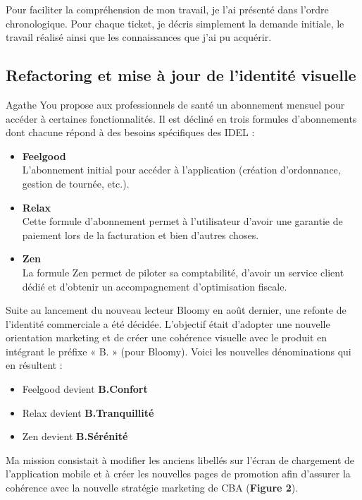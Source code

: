 \documentclass{article}
\begin{document}
Pour faciliter la compréhension de mon travail, je l'ai présenté dans l'ordre chronologique. Pour chaque ticket, je décris simplement la demande initiale, le travail réalisé ainsi que les connaissances que j'ai pu acquérir.

\subsection{Refactoring et mise à jour de l'identité visuelle}

Agathe You propose aux professionnels de santé un abonnement mensuel pour accéder à certaines fonctionnalités. Il est décliné en trois formules d'abonnements dont chacune répond à des besoins spécifiques des IDEL :

\begin{itemize}
    \item \textbf{Feelgood} \\
    L'abonnement initial pour accéder à l'application (création d'ordonnance, gestion de tournée, etc.).

    \item \textbf{Relax} \\
    Cette formule d'abonnement permet à l'utilisateur d'avoir une garantie de paiement lors de la facturation et bien d'autres choses.

    \item \textbf{Zen} \\
    La formule Zen permet de piloter sa comptabilité, d'avoir un service client dédié et d'obtenir un accompagnement d'optimisation fiscale.
\end{itemize}

Suite au lancement du nouveau lecteur Bloomy en août dernier, une refonte de l'identité commerciale a été décidée. L'objectif était d'adopter une nouvelle orientation marketing et de créer une cohérence visuelle avec le produit en intégrant le préfixe « B. » (pour Bloomy). Voici les nouvelles dénominations qui en résultent :

\begin{itemize}
    \item Feelgood devient \textbf{B.Confort}
    \item Relax devient \textbf{B.Tranquillité}
    \item Zen devient \textbf{B.Sérénité}
\end{itemize}

Ma mission consistait à modifier les anciens libellés sur l'écran de chargement de l'application mobile et à créer les nouvelles pages de promotion afin d'assurer la cohérence avec la nouvelle stratégie marketing de CBA (\textbf{Figure 2}).
\end{document}
